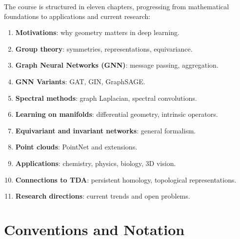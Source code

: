 The course is structured in eleven chapters, progressing from mathematical
foundations to applications and current research:

\begin{enumerate}
    \item \textbf{Motivations}: why geometry matters in deep learning.
    \item \textbf{Group theory}: symmetries, representations, equivariance.
    \item \textbf{Graph Neural Networks (GNN)}: message passing, aggregation.
    \item \textbf{GNN Variants}: GAT, GIN, GraphSAGE.
    \item \textbf{Spectral methods}: graph Laplacian, spectral convolutions.
    \item \textbf{Learning on manifolds}: differential geometry, intrinsic operators.
    \item \textbf{Equivariant and invariant networks}: general formalism.
    \item \textbf{Point clouds}: PointNet and extensions.
    \item \textbf{Applications}: chemistry, physics, biology, 3D vision.
    \item \textbf{Connections to TDA}: persistent homology, topological
          representations.
    \item \textbf{Research directions}: current trends and open problems.
\end{enumerate}

\section*{Conventions and Notation}

